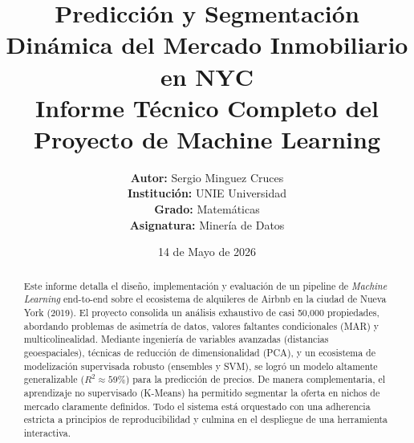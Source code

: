 \documentclass[11pt,a4paper,twoside]{report}
\title{
    \vspace{-2cm}
    \Huge \textbf{Predicción y Segmentación Dinámica del Mercado Inmobiliario en NYC}\\[0.5cm]
    \Large Informe Técnico Completo del Proyecto de Machine Learning
}
\author{
    \textbf{Autor:} Sergio Minguez Cruces\\
    \textbf{Institución:} UNIE Universidad\\
    \textbf{Grado:} Matemáticas\\
    \textbf{Asignatura:} Minería de Datos
}
\date{14 de Mayo de 2026}
\begin{document}
\maketitle

\begin{abstract}
Este informe detalla el diseño, implementación y evaluación de un pipeline de \textit{Machine Learning} end-to-end sobre el ecosistema de alquileres de Airbnb en la ciudad de Nueva York (2019). El proyecto consolida un análisis exhaustivo de casi 50,000 propiedades, abordando problemas de asimetría de datos, valores faltantes condicionales (MAR) y multicolinealidad. Mediante ingeniería de variables avanzadas (distancias geoespaciales), técnicas de reducción de dimensionalidad (PCA), y un ecosistema de modelización supervisada robusto (ensembles y SVM), se logró un modelo altamente generalizable ($R^2 \approx 59\%$) para la predicción de precios. De manera complementaria, el aprendizaje no supervisado (K-Means) ha permitido segmentar la oferta en nichos de mercado claramente definidos. Todo el sistema está orquestado con una adherencia estricta a principios de reproducibilidad y culmina en el despliegue de una herramienta interactiva.
\end{abstract}

\tableofcontents
\listoffigures
\listoftables

\clearpage











\end{document}
